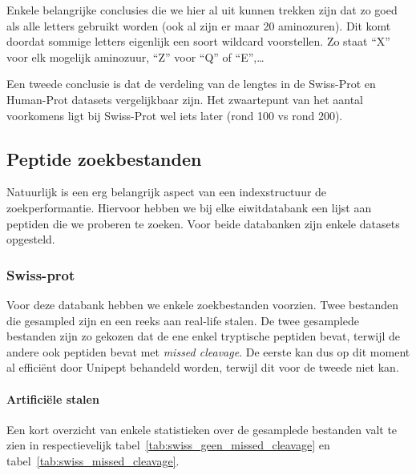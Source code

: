 \documentclass[11pt,dutch,faculty=we,layout=titlefont,underline=false,titleUppercase=true,titleUnderline=true]{ugent2016-report}
\begin{document}
    Enkele belangrijke conclusies die we hier al uit kunnen trekken zijn dat zo goed als alle letters gebruikt worden (ook al zijn er maar 20 aminozuren).
    Dit komt doordat sommige letters eigenlijk een soort wildcard voorstellen.
    Zo staat ``X'' voor elk mogelijk aminozuur, ``Z'' voor ``Q'' of ``E'',\ldots

    Een tweede conclusie is dat de verdeling van de lengtes in de Swiss-Prot en Human-Prot datasets vergelijkbaar zijn.
    Het zwaartepunt van het aantal voorkomens ligt bij Swiss-Prot wel iets later (rond 100 vs rond 200).

    \subsection{Peptide zoekbestanden}\label{subsec:peptide-zoek-bestanden}
    Natuurlijk is een erg belangrijk aspect van een indexstructuur de zoekperformantie.
    Hiervoor hebben we bij elke eiwitdatabank een lijst aan peptiden die we proberen te zoeken.
    Voor beide databanken zijn enkele datasets opgesteld.

    \subsubsection{Swiss-prot}
    Voor deze databank hebben we enkele zoekbestanden voorzien.
    Twee bestanden die gesampled zijn en een reeks aan real-life stalen.
    De twee gesamplede bestanden zijn zo gekozen dat de ene enkel tryptische peptiden bevat, terwijl de andere ook peptiden bevat met \textit{missed cleavage}.
    De eerste kan dus op dit moment al efficiënt door Unipept behandeld worden, terwijl dit voor de tweede niet kan.

    \paragraph{Artificiële stalen}
    Een kort overzicht van enkele statistieken over de gesamplede bestanden valt te zien in respectievelijk tabel~\ref{tab:swiss_geen_missed_cleavage} en tabel~\ref{tab:swiss_missed_cleavage}.
\end{document}
